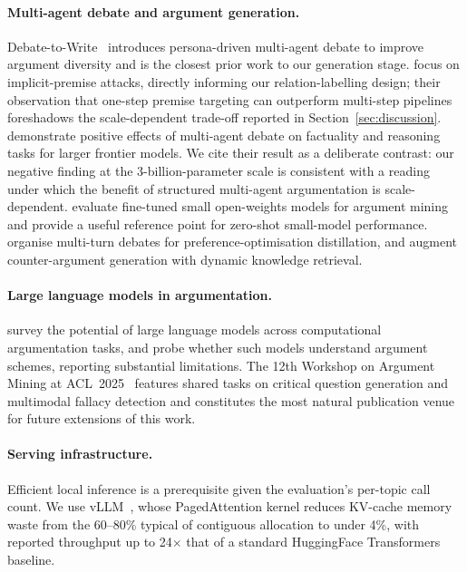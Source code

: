 \documentclass[11pt,twocolumn,letterpaper]{article}
\begin{document}
\paragraph{Multi-agent debate and argument generation.}
Debate-to-Write~\citep{hu2025debate2write} introduces persona-driven
multi-agent debate to improve argument diversity and is the closest
prior work to our generation stage.
\citet{ozaki2025llmdebate} focus on implicit-premise attacks,
directly informing our relation-labelling design; their observation
that one-step premise targeting can outperform multi-step pipelines
foreshadows the scale-dependent trade-off reported in
Section~\ref{sec:discussion}.
\citet{du2023multiagent} demonstrate positive effects of multi-agent
debate on factuality and reasoning tasks for larger frontier models.
We cite their result as a deliberate contrast: our negative finding at
the 3-billion-parameter scale is consistent with a reading under
which the benefit of structured multi-agent argumentation is
scale-dependent.
\citet{cabessa2025argmining} evaluate fine-tuned small open-weights
models for argument mining and provide a useful reference point for
zero-shot small-model performance.
\citet{zhou2025debatereflect} organise multi-turn debates for
preference-optimisation distillation, and
\citet{yeginbergen2025dynamic} augment counter-argument generation
with dynamic knowledge retrieval.

\paragraph{Large language models in argumentation.}
\citet{chen2024exploring} survey the potential of large language
models across computational argumentation tasks, and
\citet{bezou2025largellm} probe whether such models understand
argument schemes, reporting substantial limitations. The 12th
Workshop on Argument Mining at ACL~2025~\citep{argminworkshop2025}
features shared tasks on critical question generation and multimodal
fallacy detection and constitutes the most natural publication venue
for future extensions of this work.

\paragraph{Serving infrastructure.}
Efficient local inference is a prerequisite given the evaluation's
per-topic call count. We use
vLLM~\citep{kwon2023pagedattention}, whose PagedAttention kernel
reduces KV-cache memory waste from the 60--80\% typical of
contiguous allocation to under 4\%, with reported throughput up to
24$\times$ that of a standard HuggingFace Transformers baseline.
\end{document}
